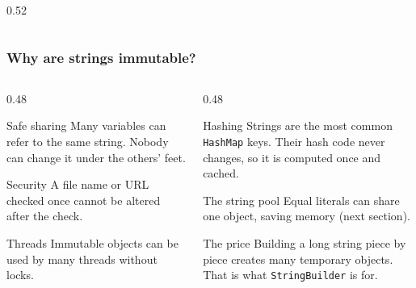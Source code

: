 \documentclass[aspectratio=169,10pt,compress]{beamer}
\begin{document}
\begin{frame}[t,fragile]
\begin{columns}[T]
\begin{column}{0.52\textwidth}
\begin{center}
      \end{center}
      
    \end{column}
  \end{columns}
\end{frame}




\begin{frame}[t,fragile] \frametitle{Why are strings immutable?}
  \begin{columns}[T]
    \begin{column}{0.48\textwidth}
      \begin{block}{Safe sharing}
        \small Many variables can refer to the same string. Nobody can change it under the others' feet.
      \end{block}
      \begin{block}{Security}
        \small A file name or URL checked once cannot be altered after the check.
      \end{block}
      \begin{block}{Threads}
        \small Immutable objects can be used by many threads without locks.
      \end{block}
    \end{column}
    \begin{column}{0.48\textwidth}
      \begin{block}{Hashing}
        \small Strings are the most common \texttt{HashMap} keys. Their hash code never changes,
        so it is computed once and cached.
      \end{block}
      \begin{block}{The string pool}
        \small Equal literals can share one object, saving memory (next section).
      \end{block}
      \begin{alertblock}{The price}
        \small Building a long string piece by piece creates many temporary objects.
        That is what \texttt{StringBuilder} is for.
      \end{alertblock}
    \end{column}
  \end{columns}
\end{frame}
\end{document}
